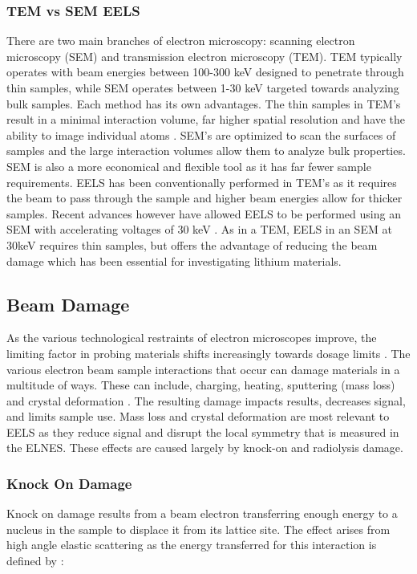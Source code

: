 \subsubsection{TEM vs SEM EELS}
There are two main branches of electron microscopy: scanning electron microscopy (SEM) and transmission electron microscopy (TEM).  TEM typically operates with beam energies between 100-300 keV designed to penetrate through thin samples, while SEM operates between 1-30 keV targeted towards analyzing bulk samples.  Each method has its own advantages.  The thin samples in TEM's result in a minimal interaction volume, far higher spatial resolution and have the ability to image individual atoms \cite{hansen_atomic-resolution_2001}. SEM's are optimized to scan the surfaces of samples and the large interaction volumes allow them to analyze bulk properties.  SEM is also a more economical and flexible tool as it has far fewer sample requirements.   EELS has been conventionally performed in TEM's as it requires the beam to pass through the sample and higher beam energies allow for thicker samples. Recent advances however have allowed EELS to be performed using an SEM with accelerating voltages of 30 keV \cite{SU_9000}.  As in a TEM, EELS in an SEM at 30keV requires thin samples, but offers the advantage of reducing the beam damage which has been essential for investigating lithium materials. 

\subsection{Beam Damage}
As the various technological restraints of electron microscopes improve, the limiting factor in probing materials shifts increasingly towards dosage limits \cite{reimer_transmission_2008}.  The various electron beam sample interactions that occur can damage materials in a multitude of ways.  These can include, charging, heating, sputtering (mass loss) and crystal deformation \cite{reimer_transmission_2008}.  The resulting damage impacts results, decreases signal, and limits sample use.  Mass loss and crystal deformation are most relevant to EELS as they reduce signal and disrupt the local symmetry that is measured in the ELNES.  These effects are caused largely by knock-on and radiolysis damage.  

\subsubsection{Knock On Damage}
Knock on damage results from a beam electron transferring enough energy to a nucleus in the sample to displace it from its lattice site.  The effect arises from high angle elastic scattering as the energy transferred for this interaction is defined by \cite{egerton_radiation_2004}: 

